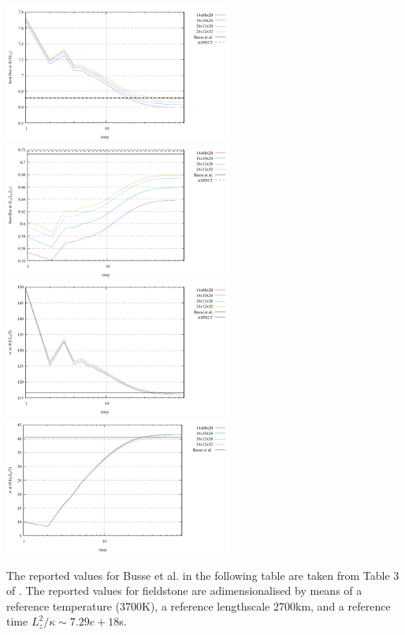 \begin{center}
\includegraphics[width=7.5cm]{python_codes/fieldstone_20/results/hf1.pdf}
\includegraphics[width=7.5cm]{python_codes/fieldstone_20/results/hf2.pdf}\\
\includegraphics[width=7.5cm]{python_codes/fieldstone_20/results/wmid1.pdf}
\includegraphics[width=7.5cm]{python_codes/fieldstone_20/results/wmid2.pdf}
\end{center}

The reported values for Busse et al. in the following table are taken from Table 3 of \cite{bucc94}.
The reported values for fieldstone are adimensionalised by means of a reference temperature (3700K),
a reference lengthscale 2700km, and a reference time $L_z^2/\kappa\sim 7.29e+18$s.



